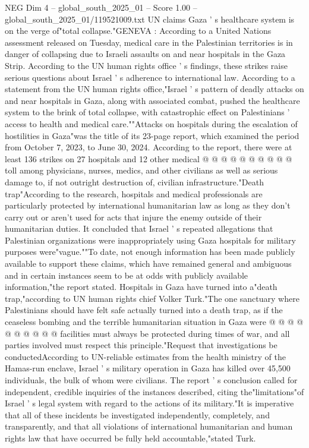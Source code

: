 \begin{textsample}{NEG Dim 4 – global\_south\_2025\_01 – Score 1.00 – global\_south\_2025\_01/119521009.txt}  \label{ex:f4_neg_443}
UN claims Gaza ' s healthcare system is on the verge of"total collapse."GENEVA : According to a United Nations assessment released on Tuesday, medical care in the Palestinian territories is in danger of collapsing due to Israeli assaults on and near hospitals in the Gaza Strip.
According to the UN human rights office ' s findings, these strikes raise serious questions about Israel ' s adherence to international law.
According to a statement from the UN human rights office,"Israel ' s pattern of deadly attacks on and near hospitals in Gaza, along with associated combat, pushed the healthcare system to the brink of total collapse, with catastrophic effect on Palestinians ' access to health and medical care.""Attacks on hospitals during the escalation of hostilities in Gaza"was the title of its 23-page report, which examined the period from October 7, 2023, to June 30, 2024.
According to the report, there were at least 136 strikes on 27 hospitals and 12 other medical @ @ @ @ @ @ @ @ @ @ toll among physicians, nurses, medics, and other civilians as well as serious damage to, if not outright destruction of, civilian infrastructure."Death trap"According to the research, hospitals and medical professionals are particularly protected by international humanitarian law as long as they don't carry out or aren't used for acts that injure the enemy outside of their humanitarian duties.
It concluded that Israel ' s repeated allegations that Palestinian organizations were inappropriately using Gaza hospitals for military purposes were"vague.""To date, not enough information has been made publicly available to support these claims, which have remained general and ambiguous and in certain instances seem to be at odds with publicly available information,"the report stated.
Hospitals in Gaza have turned into a"death trap,"according to UN human rights chief Volker Turk."The one sanctuary where Palestinians should have felt safe actually turned into a death trap, as if the ceaseless bombing and the terrible humanitarian situation in Gaza were @ @ @ @ @ @ @ @ @ @ facilities must always be protected during times of war, and all parties involved must respect this principle."Request that investigations be conductedAccording to UN-reliable estimates from the health ministry of the Hamas-run enclave, Israel ' s military operation in Gaza has killed over 45,500 individuals, the bulk of whom were civilians.
The report ' s conclusion called for independent, credible inquiries of the instances described, citing the"limitations"of Israel ' s legal system with regard to the actions of its military."It is imperative that all of these incidents be investigated independently, completely, and transparently, and that all violations of international humanitarian and human rights law that have occurred be fully held accountable,"stated Turk.

\end{textsample}
